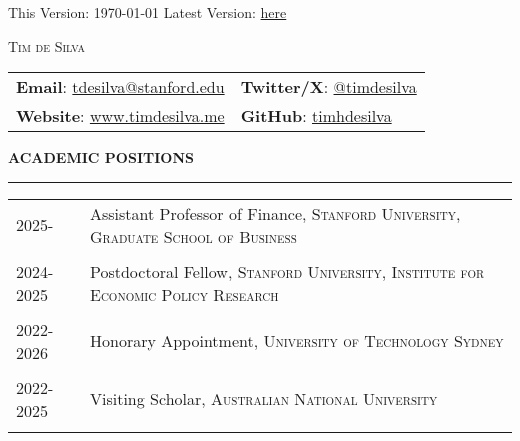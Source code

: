 \documentclass[a4paper, 10pt]{article}
\newcommand{\cvsec}[1]
{
	\needspace{2\baselineskip}
	\noindent \textbf{#1}
	
	\vspace{2pt}
	
	\hrule
	
	\bigskip
}
\newcommand{\cvitem}[2]{#1 & #2 \\ & \\}
\newenvironment{cvchrono}[1]
{
	\cvsec{#1}
	\begin{tabu} to \linewidth {X[1,l]X[6,l]} 
}
{
	\end{tabu}
}
\begin{document}
\begin{flushright}
	This Version: \today{}
	\vskip 0.01cm 
	Latest Version: \href{https://www.timdesilva.me/files/cv.pdf}{here}
\end{flushright}

\bigskip

\begin{center}
	\huge \textsc{Tim de Silva}
\end{center}

\bigskip \bigskip

\begin{tabu} to \linewidth {X[l]X[r]}
	 \textbf{Email}: \href{mailto:tdesilva@stanford.edu}{tdesilva@stanford.edu} & \textbf{Twitter/X}: \href{https://twitter.com/timdesilva}{@timdesilva} \\
	\textbf{Website}: \href{http://www.timdesilva.me}{www.timdesilva.me} & \textbf{GitHub}: \href{https://github.com/timhdesilva}{timhdesilva} \\
\end{tabu}

\bigskip \bigskip

\begin{cvchrono}{ACADEMIC POSITIONS}
	\cvitem{2025-}{Assistant Professor of Finance, \textsc{Stanford University, Graduate School of Business}
		}
	\cvitem{2024-2025}{Postdoctoral Fellow, \textsc{Stanford University, Institute for Economic Policy Research}
		}
	\cvitem{2022-2026}{Honorary Appointment, \textsc{University of Technology Sydney}}
	\cvitem{2022-2025}{Visiting Scholar, \textsc{Australian National University}}
\end{cvchrono}
\end{document}
